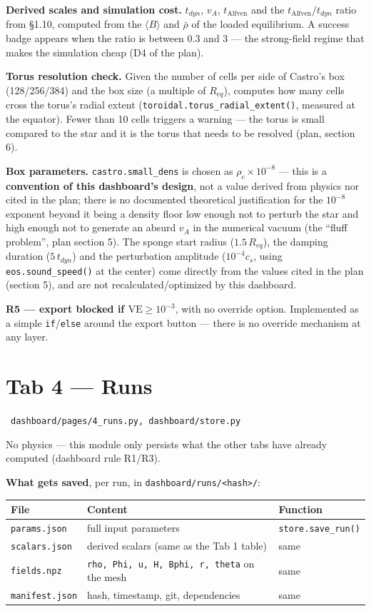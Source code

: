 \documentclass[11pt,a4paper]{scrartcl}
\newcommand{\arrowto}[1]{%
  \par\vspace{2pt}\noindent{\color{linkblue}$\rightarrow$}~\texttt{\small #1}\par\vspace{2pt}}
\newcommand{\code}[1]{\texttt{\small #1}}
\begin{document}
\textbf{Derived scales and simulation cost.} $t_{dyn}$, $v_A$,
$t_{\text{Alfven}}$ and the $t_{\text{Alfven}}/t_{dyn}$ ratio from
\S1.10, computed from the $\langle B\rangle$ and $\bar\rho$ of the loaded
equilibrium. A success badge appears when the ratio is between 0.3 and 3
--- the strong-field regime that makes the simulation cheap (D4 of the
plan).

\textbf{Torus resolution check.} Given the number of cells per side of
Castro's box (128/256/384) and the box size (a multiple of $R_{eq}$),
computes how many cells cross the torus's radial extent
(\code{toroidal.torus\_radial\_extent()}, measured at the equator).
Fewer than 10 cells triggers a warning --- the torus is small compared
to the star and it is the torus that needs to be resolved (plan, section
6).

\textbf{Box parameters.} \code{castro.small\_dens} is chosen as
$\rho_c\times10^{-8}$ --- this is a \textbf{convention of this
dashboard's design}, not a value derived from physics nor cited in the
plan; there is no documented theoretical justification for the $10^{-8}$
exponent beyond it being a density floor low enough not to perturb the
star and high enough not to generate an absurd $v_A$ in the numerical
vacuum (the ``fluff problem'', plan section 5). The sponge start radius
($1.5\,R_{eq}$), the damping duration ($5\,t_{dyn}$) and the perturbation
amplitude ($10^{-4}c_s$, using \code{eos.sound\_speed()} at the center)
come directly from the values cited in the plan (section 5), and are not
recalculated/optimized by this dashboard.

\textbf{R5 --- export blocked if $\mathrm{VE}\ge10^{-3}$}, with no
override option. Implemented as a simple \code{if}/\code{else} around
the export button --- there is no override mechanism at any layer.

\section{Tab 4 --- Runs}
\label{sec:aba4}

\arrowto{dashboard/pages/4\_runs.py, dashboard/store.py}

No physics --- this module only persists what the other tabs have
already computed (dashboard rule R1/R3).

\textbf{What gets saved}, per run, in \code{dashboard/runs/<hash>/}:

\begingroup\small
\begin{longtable}{@{}p{2.6cm}p{5.5cm}p{2.5cm}@{}}
\toprule
\textbf{File} & \textbf{Content} & \textbf{Function}\\
\midrule
\endhead
\code{params.json} & full input parameters & \code{store.save\_run()}\\
\code{scalars.json} & derived scalars (same as the Tab 1 table) & same\\
\code{fields.npz} & \code{rho, Phi, u, H, Bphi, r, theta} on the mesh & same\\
\code{manifest.json} & hash, timestamp, git, dependencies & same\\
\bottomrule
\end{longtable}
\endgroup
\end{document}
